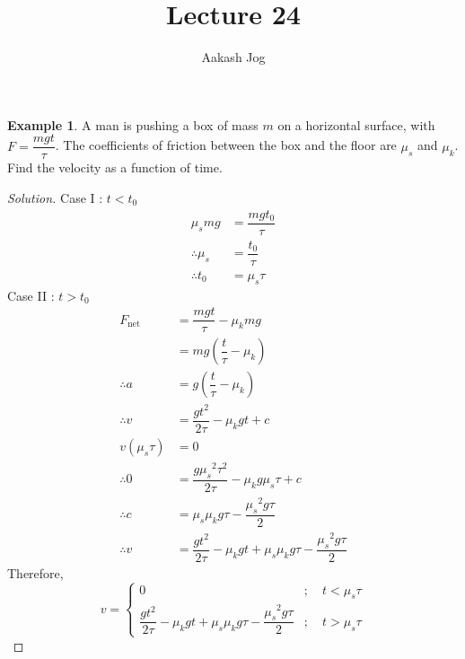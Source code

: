 \documentclass[fleqn, a4paper, 12pt]{article}
\title{Lecture 24}
\author{Aakash Jog}
\date{\formatdate{20}{1}{2015}}
\theoremstyle{definition}
\newtheorem{example}{Example}
\theoremstyle{theorem}
\newenvironment{solution}
{\begin{proof}[Solution]\let\qed\relax}
	{\end{proof}}
\begin{document}
\maketitle

\tableofcontents

\newpage
\section{}

\begin{example}
	A man is pushing a box of mass $m$ on a horizontal surface, with $F = \dfrac{m g t}{\tau}$. The coefficients of friction between the box and the floor are $\mu_s$ and $\mu_k$. Find the velocity as a function of time.
\end{example}

\begin{solution}
	Case I : $t < t_0$
	\begin{align*}
		\mu_s m g &= \dfrac{m g t_0}{\tau}\\
		\therefore \mu_s &= \dfrac{t_0}{\tau}\\
		\therefore t_0 &= \mu_s \tau
	\end{align*}
	Case II : $t > t_0$
	\begin{align*}
		F_{\text{net}} &= \dfrac{m g t}{\tau} - \mu_k m g\\
		&= m g \left( \dfrac{t}{\tau} - \mu_k \right)\\
		\therefore a &= g \left( \dfrac{t}{\tau} - \mu_k \right)\\
		\therefore v &= \dfrac{g t^2}{2 \tau} - \mu_k g t + c\\
		v(\mu_s \tau) &= 0\\
		\therefore 0 &= \dfrac{g {\mu_s}^2 \tau^2}{2 \tau} - \mu_k g \mu_s \tau + c\\
		\therefore c &= \mu_s \mu_k g \tau - \dfrac{{\mu_s}^2 g \tau}{2}\\
		\therefore v &= \dfrac{g t^2}{2 \tau} - \mu_k g t + \mu_s \mu_k g \tau - \dfrac{{\mu_s}^2 g \tau}{2}
	\end{align*}
	Therefore,
	\begin{equation*}
		v = 
			\begin{cases}
				0 &;\quad t < \mu_s \tau\\
				\dfrac{g t^2}{2 \tau} - \mu_k g t + \mu_s \mu_k g \tau - \dfrac{{\mu_s}^2 g \tau}{2} &;\quad t > \mu_s \tau
			\end{cases}
	\end{equation*}
\end{solution}
\end{document}
